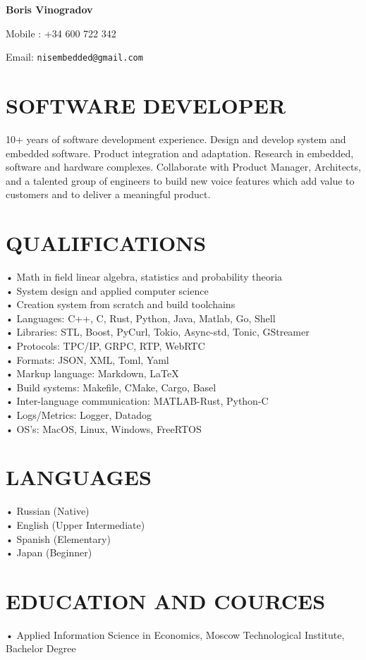 \documentclass{article}
\begin{document}
\textbf{Boris Vinogradov}

Mobile : +34 600 722 342

Email: \texttt{nisembedded@gmail.com}

\section{\textsf{SOFTWARE DEVELOPER}}
10+ years of software development experience. Design and develop system and embedded software. Product
integration and adaptation. Research in embedded, software and hardware complexes. Collaborate with Product
Manager, Architects, and a talented group of engineers to build new voice features which add value to customers
and to deliver a meaningful product.

\section{\textsf{QUALIFICATIONS}}
• Math in field linear algebra, statistics and probability theoria\\
• System design and applied computer science\\
• Creation system from scratch and build toolchains\\
• Languages: C++, C, Rust, Python, Java, Matlab, Go, Shell\\
• Libraries: STL, Boost, PyCurl, Tokio, Async-std, Tonic, GStreamer\\
• Protocols: TPC/IP, GRPC, RTP, WebRTC\\
• Formats: JSON, XML, Toml, Yaml\\
• Markup language: Markdown, \LaTeX\\
• Build systems: Makefile, CMake, Cargo, Basel\\
• Inter-language communication: MATLAB-Rust, Python-C\\
• Logs/Metrics: Logger, Datadog\\
• OS’s: MacOS, Linux, Windows, FreeRTOS

\section{\textsf{LANGUAGES}}
• Russian (Native)\\
• English (Upper Intermediate)\\
• Spanish (Elementary)\\
• Japan (Beginner)

\section{\textsf{EDUCATION AND COURCES}}
• Applied Information Science in Economics, Moscow Technological Institute, Bachelor Degree
\end{document}
